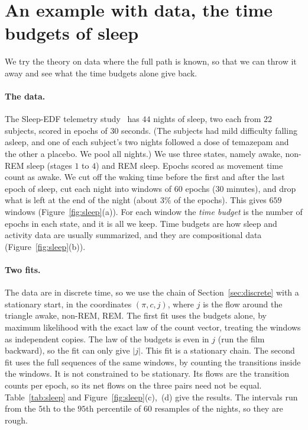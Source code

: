 \documentclass[11pt]{article}
\theoremstyle{definition}
\theoremstyle{remark}
\begin{document}
\section{An example with data, the time budgets of sleep}\label{sec:sleep}

We try the theory on data where the full path is known, so that we can throw
it away and see what the time budgets alone give back.

\paragraph{The data.} The Sleep-EDF telemetry study~\cite{kemp2000,physionet}
has $44$ nights of sleep, two each from $22$ subjects, scored in epochs of $30$
seconds. (The subjects had mild difficulty falling asleep, and one of each
subject's two nights followed a dose of temazepam and the other a placebo. We
pool all nights.) We use three states, namely awake, non-REM sleep (stages $1$ to $4$)
and REM sleep. Epochs scored as movement time count as awake. We cut off the waking time
before the first and after the last epoch of sleep, cut each night into
windows of $60$ epochs ($30$ minutes), and drop what is left at the end of the
night (about $3\%$ of the epochs). This gives $659$ windows (Figure~\ref{fig:sleep}(a)). For each window the
\emph{time budget} is the number of epochs in each state, and it is all we
keep. Time budgets are how sleep and activity data are usually summarized, and
they are compositional data~\cite{aitchison1986,chastin2015}
(Figure~\ref{fig:sleep}(b)).

\paragraph{Two fits.} The data are in discrete time, so we use the chain of
Section~\ref{sec:discrete} with a stationary start, in the coordinates
$(\pi,c,j)$, where $j$ is the flow around the triangle awake, non-REM, REM. The
first fit uses the budgets alone, by maximum likelihood with the exact law of
the count vector, treating the windows as independent copies. The law of the budgets is even in $j$ (run the film backward), so the fit can only give $\lvert
j\rvert$. This fit is a stationary chain. The second fit uses the full sequences of the same windows, by
counting the transitions inside the windows. It is not constrained to be
stationary. Its flows are the transition counts per epoch, so its net flows on
the three pairs need not be equal. Table~\ref{tab:sleep} and Figure~\ref{fig:sleep}(c),~(d)
give the results. The intervals run from the $5$th to the $95$th percentile
of $60$ resamples of the nights, so they are rough.
\end{document}
